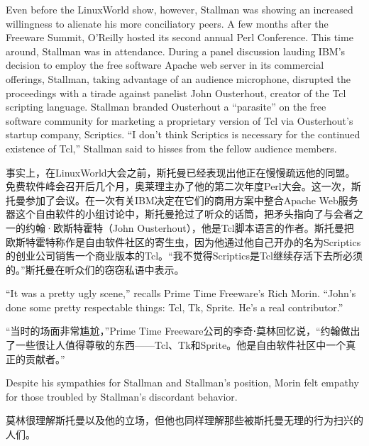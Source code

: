 \ifdefined\eng
Even before the LinuxWorld show, however, Stallman was showing an increased willingness to alienate his more conciliatory peers. A few months after the Freeware Summit, O'Reilly hosted its second annual Perl Conference. This time around, Stallman was in attendance. During a panel discussion lauding IBM's decision to employ the free software Apache web server in its commercial offerings, Stallman, taking advantage of an audience microphone, disrupted the proceedings with a tirade against panelist John Ousterhout, creator of the Tcl scripting language. Stallman branded Ousterhout a ``parasite'' on the free software community for marketing a proprietary version of Tcl via Ousterhout's startup company, Scriptics. ``I don't think Scriptics is necessary for the continued existence of Tcl,'' Stallman said to hisses from the fellow audience members.
\fi

\ifdefined\chs
事实上，在LinuxWorld大会之前，斯托曼已经表现出他正在慢慢疏远他的同盟。免费软件峰会召开后几个月，奥莱理主办了他的第二次年度Perl大会。这一次，斯托曼参加了会议。在一次有关IBM决定在它们的商用方案中整合Apache Web服务器这个自由软件的小组讨论中，斯托曼抢过了听众的话筒，把矛头指向了与会者之一的约翰·欧斯特霍特（John Ousterhout），他是Tcl脚本语言的作者。斯托曼把欧斯特霍特称作是自由软件社区的寄生虫，因为他通过他自己开办的名为Scriptics的创业公司销售一个商业版本的Tcl。``我不觉得Scriptics是Tcl继续存活下去所必须的。''斯托曼在听众们的窃窃私语中表示。
\fi

\ifdefined\eng
``It was a pretty ugly scene,'' recalls Prime Time Freeware's Rich Morin. ``John's done some pretty respectable things: Tcl, Tk, Sprite. He's a real contributor.''
\fi

\ifdefined\chs
``当时的场面非常尴尬，''Prime Time Freeware公司的李奇⋅莫林回忆说，``约翰做出了一些很让人值得尊敬的东西——Tcl、Tk和Sprite。他是自由软件社区中一个真正的贡献者。''
\fi

\ifdefined\eng
Despite his sympathies for Stallman and Stallman's position, Morin felt empathy for those troubled by Stallman's discordant behavior.
\fi

\ifdefined\chs
莫林很理解斯托曼以及他的立场，但他也同样理解那些被斯托曼无理的行为扫兴的人们。
\fi

